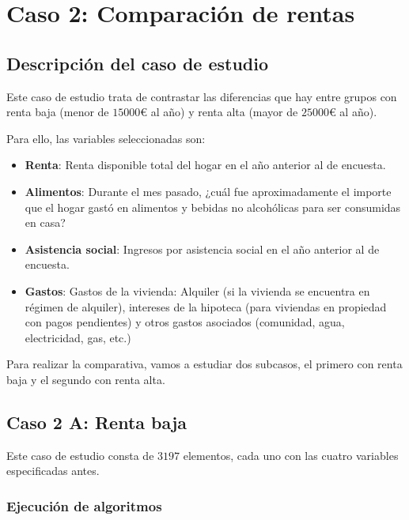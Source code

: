 
\chapter{Caso 2: Comparación de rentas}


\section{Descripción del caso de estudio}
Este caso de estudio trata de contrastar las diferencias que hay entre grupos con renta baja (menor de $15000$€ al año) y renta alta (mayor de $25000$€ al año).

Para ello, las variables seleccionadas son:
\begin{itemize}
\item \textbf{Renta}: Renta disponible total del hogar en el año anterior al de encuesta.
\item \textbf{Alimentos}: Durante el mes pasado, ¿cuál fue aproximadamente el importe que el hogar gastó en alimentos y bebidas no alcohólicas para ser consumidas en casa?
\item \textbf{Asistencia social}: Ingresos por asistencia social en el año anterior al
de encuesta.
\item \textbf{Gastos}: Gastos de la vivienda: Alquiler (si la vivienda se encuentra en régimen de alquiler), intereses de la hipoteca (para viviendas en propiedad con pagos pendientes) y otros gastos asociados (comunidad, agua, electricidad, gas, etc.)
\end{itemize}

Para realizar la comparativa, vamos a estudiar dos subcasos, el primero con renta baja y el segundo con renta alta.

\section{Caso 2 A: Renta baja}

Este caso de estudio consta de $3197$ elementos, cada uno con las cuatro variables especificadas antes.

\subsection{Ejecución de algoritmos}

